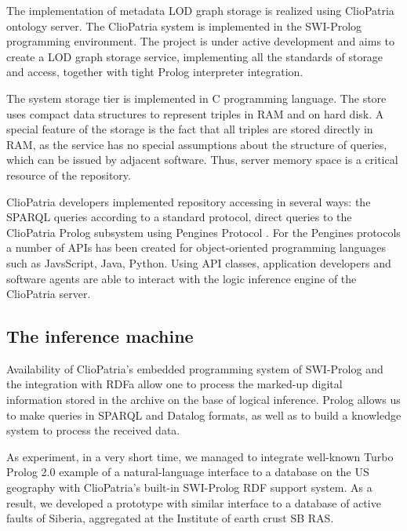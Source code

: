 \documentclass[12pt]{llncs}
\begin{document}
The implementation of metadata LOD graph storage is realized using
ClioPatria \cite{b8} ontology server. The ClioPatria system is implemented
in the SWI-Prolog programming environment. The project is under active
development and aims to create a LOD graph storage service, implementing
all the standards of storage and access, together with tight Prolog
interpreter integration.

The system storage tier is implemented in C programming language. The
store uses compact data structures to represent triples in RAM and on
hard disk. A special feature of the storage is the fact that all triples
are stored directly in RAM, as the service has no special assumptions
about the structure of queries, which can be issued by adjacent
software. Thus, server memory space is a critical resource of the
repository.

ClioPatria developers implemented repository accessing in several ways:
the SPARQL queries according to a standard protocol, direct queries to
the ClioPatria Prolog subsystem using Pengines Protocol \cite{b9}. For the
Pengines protocols a number of APIs has been created for object-oriented
programming languages such as JavsScript, Java, Python. Using API
classes, application developers and software agents are able to interact
with the logic inference engine of the ClioPatria server.

\subsection{The inference machine}

Availability of ClioPatria's embedded programming system of SWI-Prolog
\cite{b10} and the integration with RDFa allow one to process the
marked-up digital information stored in the archive on the base of
logical inference. Prolog allows us to make queries in SPARQL and
Datalog formats, as well as to build a knowledge system to process the
received data.

As experiment, in a very short time, we managed to integrate well-known
Turbo Prolog 2.0 example of a natural-language interface to a database
on the US geography with ClioPatria's built-in SWI-Prolog RDF support
system. As a result, we developed a prototype with similar interface to
a database of active faults of Siberia, aggregated at the Institute of
earth crust SB RAS.

\end{document}
